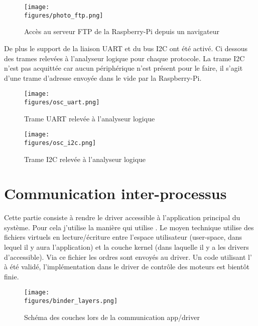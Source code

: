 \begin{figure}[H]
    \centering
    \texttt{[image: \\figures/photo\_ftp.png]}
    \decoRule
    \caption[
    Accès au serveur FTP de la Raspberry-Pi depuis un navigateur]{
    Accès au serveur FTP de la Raspberry-Pi depuis un navigateur}
    \label{fig:Accès au serveur FTP de la Raspberry-Pi depuis un navigateur}
    \end{figure}

\vspace{1cm}

De plus le support de la liaison UART et du bus I2C ont été activé. Ci dessous des trames relevées à l'analyseur logique pour chaque protocole. La trame I2C n'est pas acquittée car aucun périphérique n'est présent pour le faire, il s'agit d'une trame d'adresse envoyée dans le vide par la Raspberry-Pi.

\begin{figure}[H]
    \centering
    \texttt{[image: \\figures/osc\_uart.png]}
    \decoRule
    \caption[
    Trame UART relevée à l'analyseur logique]{
    Trame UART relevée à l'analyseur logique}
    \label{fig:Trame UART relevée à l'analyseur logique}
    \end{figure}

\begin{figure}[H]
    \centering
    \texttt{[image: \\figures/osc\_i2c.png]}
    \decoRule
    \caption[
    Trame I2C relevée à l'analyseur logique]{
    Trame I2C relevée à l'analyseur logique}
    \label{fig:Trame I2C relevée à l'analyseur logique}
    \end{figure}

\section{Communication inter-processus}

Cette partie consiste à rendre le driver accessible à l'application principal du système. Pour cela j'utilise la manière qui utilise . Le moyen technique utilise des fichiers virtuels en lecture/écriture entre l'espace utilisateur (user-space, dans lequel il y aura l'application) et la couche kernel (dans laquelle il y a les drivers d'accessible). Via ce fichier les ordres sont envoyés au driver.
Un code utilisant l' à été validé, l'implémentation dans le driver de contrôle des moteurs est bientôt finie.

\begin{figure}[H]
    \centering
	\texttt{[image: \\figures/binder\_layers.png]}
    \decoRule
    \caption[
    Schéma des couches lors de la communication app/driver]{
    Schéma des couches lors de la communication app/driver}
    \label{fig:Schéma des couches lors de la communication app/driver}
    \end{figure}


